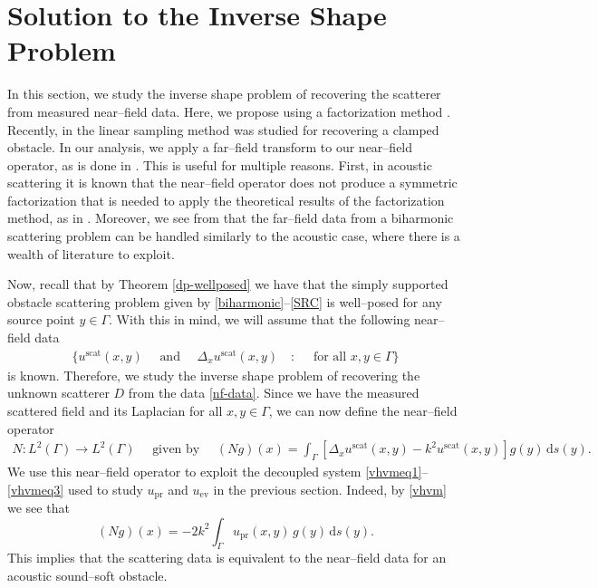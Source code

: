 \documentclass{article}
\newcommand{\dd}{\mathrm{d}}
\numberwithin{equation}{section}
\begin{document}
\section{Solution to the Inverse Shape Problem}\label{ip}
In this section, we study the inverse shape problem of recovering the scatterer from measured near--field data. Here, we propose using a factorization method \cite{kirschbook}. Recently, in \cite{near-lsmBH} the linear sampling method was studied for recovering a clamped obstacle. In our analysis, we apply a far--field transform to our near--field operator, as is done in \cite{nf-fft-dsm}. This is useful for multiple reasons. First, in acoustic scattering it is known that the near--field operator does not produce a symmetric factorization that is needed to apply the theoretical results of the factorization method, as in \cite{HarrisRome,Hu-nfFM,shixu-nfFM}. Moreover, we see from \cite{DSM-BH24,LSM-BH25} that the far--field data from a biharmonic scattering problem can be handled similarly to the acoustic case, where there is a wealth of literature to exploit. 

Now, recall that by Theorem \ref{dp-wellposed} we have that the simply supported obstacle scattering problem given by \eqref{biharmonic}--\eqref{SRC} is well--posed for any source point $y \in \Gamma$. With this in mind, we will assume that the following near--field data 
\begin{align} \label{nf-data}
\big\{ u^{\text{scat}}( x , y) \quad \text{ and } \quad \Delta_x u^{\text{scat}}( x , y) \quad : \quad \text{ for all $x,y \in \Gamma$} \big\}
\end{align}
is known. Therefore, we study the inverse shape problem of recovering the unknown scatterer $D$ from the data \eqref{nf-data}. Since we have the measured scattered field and its Laplacian for all $x,y \in \Gamma$, we can now define the near--field operator 
\begin{align} \label{nf-op}
N: L^2(\Gamma) \longrightarrow L^2(\Gamma) \quad \text{ given by } \quad (N g)(x) = \int_{\Gamma} \left[ \Delta_x u^{\text{scat}}( x , y) -k^2 u^{\text{scat}}( x , y) \right] g(y) \, \dd s(y). 
\end{align}
We use this near--field operator to exploit the decoupled system \eqref{vhvmeq1}--\eqref{vhvmeq3} used to study $u_\textrm{pr}$ and $u_\textrm{ev}$ in the previous section. Indeed, by \eqref{vhvm} we see that 
$$(N g)(x) = -2k^2 \int_{\Gamma} u_\textrm{pr}(x,y) \, g(y) \, \dd s(y).$$
This implies that the scattering data is equivalent to the near--field data for an acoustic sound--soft obstacle.
\end{document}
